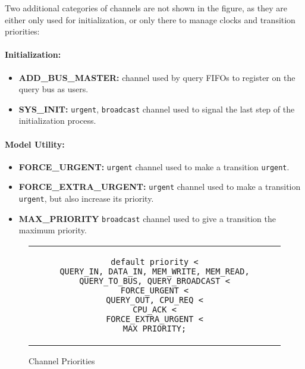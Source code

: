 Two additional categories of channels are not shown in the figure, as they are
either only used for initialization, or only there to manage clocks and
transition priorities:

\paragraph{Initialization:}
\begin{itemize}
\item \textbf{ADD\_BUS\_MASTER:}
   channel used by query FIFOs to register on the query bus as users.
\item \textbf{SYS\_INIT:}
   \texttt{urgent}, \texttt{broadcast} channel used to signal the last step of
   the initialization process.
\end{itemize}

\paragraph{Model Utility:}
\begin{itemize}
\item \textbf{FORCE\_URGENT:}
   \texttt{urgent} channel used to make a transition \texttt{urgent}.

\item \textbf{FORCE\_EXTRA\_URGENT:}
   \texttt{urgent} channel used to make a transition \texttt{urgent}, but also
   increase its priority.

\item \textbf{MAX\_PRIORITY}
   \texttt{broadcast} channel used to give a transition the maximum priority.
\end{itemize}

\begin{figure}[hbt!]
\begin{center}
\begin{tabular}{c}
\begin{lstlisting}
default priority <
QUERY_IN, DATA_IN, MEM_WRITE, MEM_READ, QUERY_TO_BUS, QUERY_BROADCAST <
FORCE_URGENT <
QUERY_OUT, CPU_REQ <
CPU_ACK <
FORCE_EXTRA_URGENT <
MAX_PRIORITY;
\end{lstlisting}
\end{tabular}
\end{center}
\caption{Channel Priorities}
\label{fig:modeling:chan_prio}
\end{figure}

